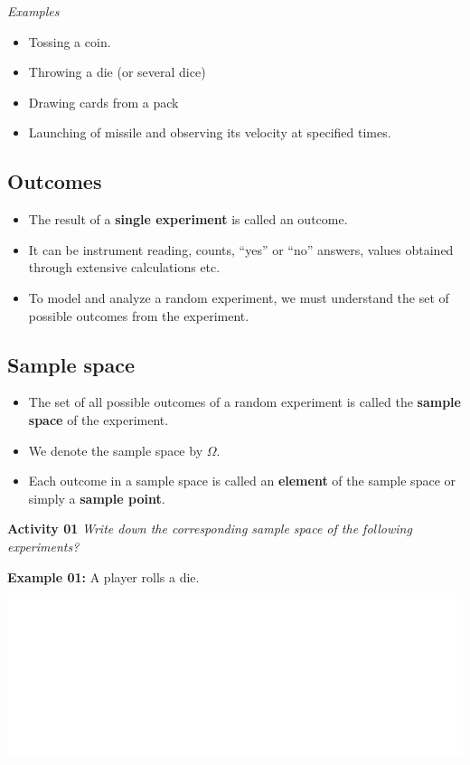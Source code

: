 \documentclass[]{book}
\providecommand{\tightlist}{%
  \setlength{\itemsep}{0pt}\setlength{\parskip}{0pt}}
\begin{document}
\emph{Examples}

\begin{itemize}
\tightlist
\item
  Tossing a coin.
\item
  Throwing a die (or several dice)
\item
  Drawing cards from a pack
\item
  Launching of missile and observing its velocity at specified times.
\end{itemize}

\hypertarget{outcomes}{%
\subsection{Outcomes}\label{outcomes}}

\begin{itemize}
\tightlist
\item
  The result of a \textbf{single experiment} is called an outcome.
\item
  It can be instrument reading, counts, ``yes'' or ``no'' answers, values obtained through extensive calculations etc.
\item
  To model and analyze a random experiment, we must understand the set of possible outcomes from the experiment.
\end{itemize}

\hypertarget{sample-space}{%
\subsection{Sample space}\label{sample-space}}

\begin{itemize}
\tightlist
\item
  The set of all possible outcomes of a random experiment is called the \textbf{sample space} of the experiment.
\item
  We denote the sample space by \(\Omega\).
\item
  Each outcome in a sample space is called an \textbf{element} of the sample space or simply a \textbf{sample point}.
\end{itemize}

\textbf{Activity 01}
\emph{Write down the corresponding sample space of the following experiments?}

\textbf{Example 01:} A player rolls a die.

\begin{center}\includegraphics[width=1\linewidth]{figure/box71a-1} \end{center}
\end{document}
